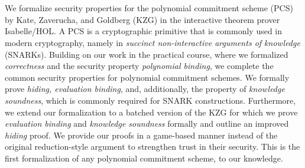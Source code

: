 \chapter{\abstractname}

We formalize security properties for the polynomial commitment scheme (PCS) by Kate, Zaverucha, and Goldberg (KZG) in the interactive theorem prover Isabelle/HOL. A PCS is a cryptographic primitive that is commonly used in modern cryptography, namely in \textit{succinct non-interactive arguments of knowledge} (SNARKs). 
Building on our work in the practical course, where we formalized \textit{correctness} and the security property \textit{polynomial binding}, we complete the common security properties for polynomial commitment schemes. We formally prove \textit{hiding, evaluation binding}, and, additionally, the property of \textit{knowledge soundness}, which is commonly required for SNARK constructions.
Furthermore, we extend our formalization to a batched version of the KZG for which we prove \textit{evaluation binding} and \textit{knowledge soundness} formally and outline an improved \textit{hiding} proof.
We provide our proofs in a game-based manner instead of the original reduction-style argument to strengthen trust in their security.
This is the first formalization of any polynomial commitment scheme, to our knowledge. 